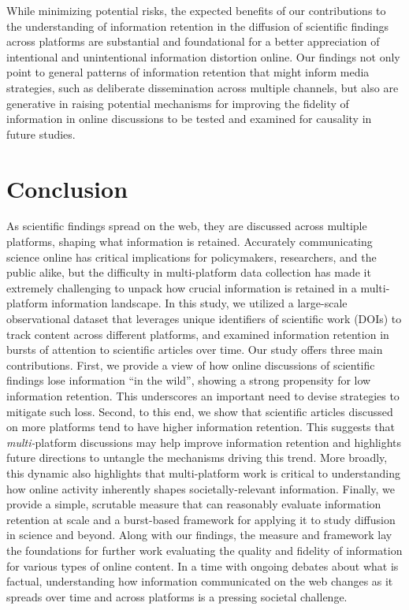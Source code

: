 \documentclass[letterpaper]{article} %
\begin{document}
While minimizing potential risks, the expected benefits of our contributions to the understanding of information retention in the diffusion of scientific findings across platforms are substantial and foundational for a better appreciation of intentional and unintentional information distortion online. Our findings not only point to general patterns of information retention that might inform media strategies, such as deliberate dissemination across multiple channels, but also are generative in raising potential mechanisms for improving the fidelity of information in online discussions to be tested and examined for causality in future studies.


\section{Conclusion}

As scientific findings spread on the web, they are discussed across multiple platforms, shaping what information is retained. Accurately communicating science online has critical implications for policymakers, researchers, and the public alike, but the difficulty in multi-platform data collection has made it extremely challenging to unpack how crucial information is retained in a multi-platform information landscape. In this study, we utilized a large-scale observational dataset that leverages unique identifiers of scientific work (DOIs) to track content across different platforms, and examined information retention in bursts of attention to scientific articles over time. Our study offers three main contributions. First, we provide a view of how online discussions of scientific findings lose information ``in the wild'', showing a strong propensity for low information retention. This underscores an important need to devise strategies to mitigate such loss. Second, to this end, we show that scientific articles discussed on more platforms tend to have higher information retention. This suggests that \textit{multi-}platform discussions may help improve information retention and highlights future directions to untangle the mechanisms driving this trend. More broadly, this dynamic also highlights that multi-platform work is critical to understanding how online activity inherently shapes societally-relevant information. Finally, we provide a simple, scrutable measure that can reasonably evaluate information retention at scale and a burst-based framework for applying it to study diffusion in science and beyond. Along with our findings, the measure and framework lay the foundations for further work evaluating the quality and fidelity of information for various types of online content. In a time with ongoing debates about what is factual, understanding how information communicated on the web changes as it spreads over time and across platforms is a pressing societal challenge.
\end{document}
